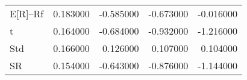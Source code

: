 \begin{tabular}{lrrrr}
\toprule
\midrule
E[R]--Rf & 0.183000 & -0.585000 & -0.673000 & -0.016000 \\
t & 0.164000 & -0.684000 & -0.932000 & -1.216000 \\
Std & 0.166000 & 0.126000 & 0.107000 & 0.104000 \\
SR & 0.154000 & -0.643000 & -0.876000 & -1.144000 \\
\bottomrule
\end{tabular}
